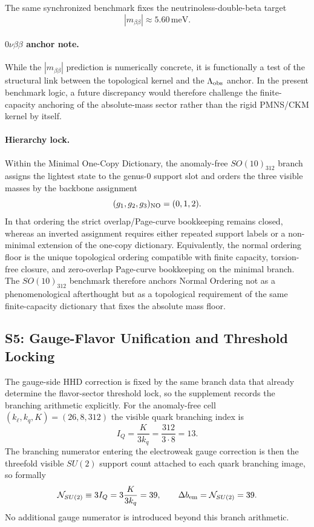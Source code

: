 \documentclass[11pt]{article}
\begin{document}
The same synchronized benchmark fixes the neutrinoless-double-beta target
\begin{equation}
 |m_{\beta\beta}|\approx 5.60\,\mathrm{meV}.
\end{equation}

\paragraph{$0\nu\beta\beta$ anchor note.}
While the $|m_{\beta\beta}|$ prediction is numerically concrete, it is functionally a test of the structural link between the topological kernel and the $\Lambda_{\rm obs}$ anchor. In the present benchmark logic, a future discrepancy would therefore challenge the finite-capacity anchoring of the absolute-mass sector rather than the rigid PMNS/CKM kernel by itself.

\paragraph{Hierarchy lock.}
Within the Minimal One-Copy Dictionary, the anomaly-free $SO(10)_{312}$ branch
assigns the lightest state to the genus-$0$ support slot and orders the three
visible masses by the backbone assignment
\begin{equation}
 (g_1,g_2,g_3)_{\rm NO}=(0,1,2).
\end{equation}
In that ordering the strict overlap/Page-curve bookkeeping remains closed,
whereas an inverted assignment requires either repeated support labels or a
non-minimal extension of the one-copy dictionary. Equivalently, the normal
ordering floor is the unique topological ordering compatible with finite
capacity, torsion-free closure, and zero-overlap Page-curve bookkeeping on the
minimal branch. The $SO(10)_{312}$ benchmark therefore anchors Normal Ordering
not as a phenomenological afterthought but as a topological requirement of the
same finite-capacity dictionary that fixes the absolute mass floor.

\subsection*{S5: Gauge-Flavor Unification and Threshold Locking}
\label{supp-sec:s5-gauge-flavor-threshold}

The gauge-side HHD correction is fixed by the same branch data that already
determine the flavor-sector threshold lock, so the supplement records the
branching arithmetic explicitly. For the anomaly-free cell
$(k_{\ell},k_q,K)=(26,8,312)$ the visible quark branching index is
\begin{equation}
 I_Q
 =
 \frac{K}{3k_q}
 =
 \frac{312}{3\cdot 8}
 = 13.
\end{equation}
The branching numerator entering the electroweak gauge correction is then the
threefold visible $SU(2)$ support count attached to each quark branching image,
so formally
\begin{equation}
 \mathcal N_{SU(2)}
 \equiv
 3I_Q
 =
 3\frac{K}{3k_q}
 = 39,
 \qquad
 \Delta b_{\rm em}=\mathcal N_{SU(2)}=39.
\end{equation}
No additional gauge numerator is introduced beyond this branch arithmetic.
\end{document}
